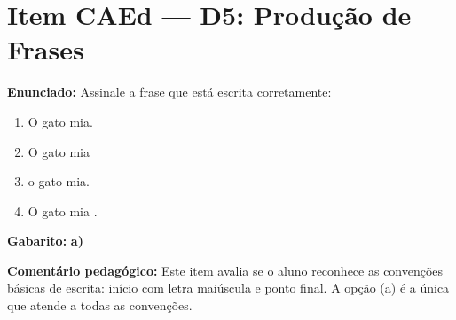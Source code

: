 \section{Item CAEd --- D5: Produ\c{c}\~{a}o de Frases}

\begin{exercicio}

\textbf{Enunciado:} Assinale a frase que est\'{a} escrita corretamente:

\begin{enumerate}[label=\alph*)]
  \item O gato mia.
  \item O gato mia
  \item o gato mia.
  \item O gato mia .
\end{enumerate}

\textbf{Gabarito:} \textbf{a)}

\textbf{Coment\'{a}rio pedag\'{o}gico:} Este item avalia se o aluno
reconhece as conven\c{c}\~{o}es b\'{a}sicas de escrita: in\'{i}cio
com letra mai\'{u}scula e ponto final. A op\c{c}\~{a}o (a) \'{e} a
\'{u}nica que atende a todas as conven\c{c}\~{o}es.
\end{exercicio}

